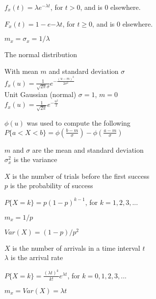$f_x(t) = \lambda e^{-\lambda t}$, for $t>0$, and is $0$ elsewhere.

$F_x(t) = 1-e{-\lambda t}$, for $t\geq0$, and is $0$ elsewhere.

$m_x=\sigma_x=1/\lambda$
    

The normal distribution

With mean $m$ and standard deviation $\sigma$ \\
$f_x(u)=\frac{1}{\sqrt{2\pi}\sigma}e^{-\frac{(u-m)^2}{2\sigma^2}}$ \\
Unit Gaussian (normal) $\sigma = 1$, $m=0$ \\
$f_x(u)=\frac{1}{\sqrt{2\pi}}e^{-\frac{u^2}{2}}$

$\phi(u)$ was used to compute the following \\
$P\{a<X<b\}=\phi(\frac{b-m}{\sigma})-\phi(\frac{a-m}{\sigma})$

$m$ and $\sigma$ are the mean and standard deviation \\
$\sigma_x^2$ is the variance
    


$X$ is the number of trials before the first success \\
$p$ is the probability of success

$P\{X=k\} = p(1-p)^{k-1}$, for $k=1,2,3,...$

$m_x=1/p$

$Var(X)=(1-p)/p^2$

    


$X$ is the number of arrivals in a time interval $t$ \\
$\lambda$ is the arrival rate

$P\{X=k\}=\frac{(\lambda t)^k}{k!}e^{\lambda t}$, for $k=0,1,2,3,...$

$m_x= Var(X) = \lambda t$
    



